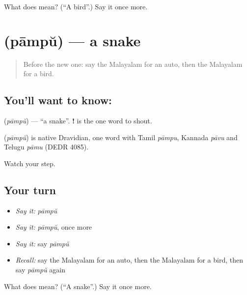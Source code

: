 \begin{tcolorbox}[breakable,colback=teal!4,colframe=teal!35!black,title={Before you move on}]
What does  mean? (\textquotedblleft{}A bird\textquotedblright{}.) Say it once more.
\end{tcolorbox}
\section[\texorpdfstring{\ml{പാമ്പ്} (pāmpŭ)}{പാമ്പ് (pāmpŭ)}]{ (pāmpŭ) — a snake}

\label{lesson:ML-C138-snake}



\begin{quote}
Before the new one: say the Malayalam for an auto, then the Malayalam for a bird.
\end{quote}

\subsection*{You'll want to know: }
\textbf{} (\emph{pāmpŭ}) — \textquotedblleft{}a snake\textquotedblright{}. \textbf{!} is the one word to shout.

\begin{cousinweb}
\textbf{} (\emph{pāmpŭ}) is native Dravidian, one word with Tamil \emph{pāmpu}, Kannada \emph{pāvu} and Telugu \emph{pāmu} (DEDR 4085).
\end{cousinweb}

\begin{grammarlens}[title={What you've built}]
Watch your step.
\end{grammarlens}

\subsection*{Your turn}
\begin{itemize}
\raggedright
  \item \emph{Say it:} \emph{pāmpŭ}
  \item \emph{Say it:} \emph{pāmpŭ}, once more
  \item \emph{Say it:} say \emph{pāmpŭ}
  \item \emph{Recall:} say the Malayalam for an auto, then the Malayalam for a bird, then say \emph{pāmpŭ} again
\end{itemize}

\begin{tcolorbox}[breakable,colback=teal!4,colframe=teal!35!black,title={Before you move on}]
What does  mean? (\textquotedblleft{}A snake\textquotedblright{}.) Say it once more.
\end{tcolorbox}
